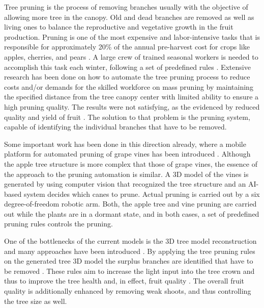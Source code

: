 \documentclass[1p]{elsarticle}
\begin{document}
Tree pruning is the process of removing branches usually with the
objective of allowing more tree in the canopy. Old and dead branches are
removed as well as living ones to balance the reproductive and
vegetative growth in the fruit production. Pruning is one of the most
expensive and labor-intensive tasks that is responsible for
approximately 20\% of the annual pre-harvest cost for crops like apples,
cherries, and pears \cite{karkee_identification_2014}. A large crew of trained seasonal workers is
needed to accomplish this task each winter, following a set of
predefined rules \cite{akbar_novel_2016} . Extensive research has been done on how to
automate the tree pruning process to reduce costs and/or demands for the
skilled workforce \cite{karkee_identification_2014,moore_mechanical_1958,jensen_effects_1980}
on mass pruning by maintaining the specified distance from the tree
canopy center with limited ability to ensure a high pruning quality. The
results were not satisfying, as the evidenced by reduced quality and
yield of fruit \cite{karkee_identification_2014}. The solution to that problem is the pruning
system, capable of identifying the individual branches that have to be
removed.

Some important work has been done in this direction already, where a
mobile platform for automated pruning of grape vines has been introduced
\cite{botterill_robot_2017}. Although the apple tree structure is more complex that those of
grape vines, the essence of the approach to the pruning automation is
similar. A 3D model of the vines is generated by using computer vision
that recognized the tree structure and an AI- based system decides which
canes to prune. Actual pruning is carried out by a six degree-of-freedom
robotic arm. Both, the apple tree and vine pruning are carried out while
the plants are in a dormant state, and in both cases, a set of
predefined pruning rules controls the pruning.

One of the bottlenecks of the current models is the 3D tree model
reconstruction and many approaches have been introduced \cite{xie_tree_2016, zhang_data-driven_2014,livny_automatic_2010}. By
applying the tree pruning rules on the generated tree 3D model the
surplus branches are identified that have to be removed \cite{akbar_novel_2016,elfiky_automation_2015,medeiros_modeling_2017}.
These rules aim to increase the light input into the tree crown and thus
to improve the tree health \cite{simon_does_2006} and, in effect, fruit quality
\cite{bastias_light_2012}. The overall fruit quality is additionally enhanced by removing
weak shoots, and thus controlling the tree size as well.
\end{document}
